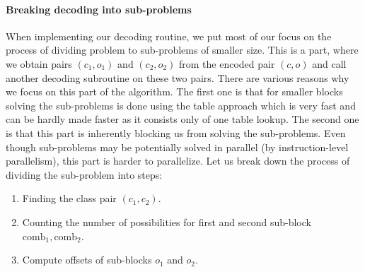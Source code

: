 \paragraph{Breaking decoding into sub-problems}

When implementing our decoding routine, we put most of our focus on the process of dividing problem to
sub-problems of smaller size. This is a part, where we obtain pairs $(c_1, o_1)$ and $(c_2, o_2)$
from the encoded pair $(c, o)$ and call another decoding subroutine on these two pairs.
There are various reasons why we focus on this part of the algorithm. The first one is that for smaller
blocks solving the sub-problems is done using the table approach which is very fast and can be hardly
made faster as it consists only of one table lookup. The second one is that this part is
inherently blocking us from solving the sub-problems. Even though sub-problems may be potentially
solved in parallel (by instruction-level parallelism), this part is harder to parallelize. Let us break down
the process of dividing the sub-problem into steps:

\begin{enumerate}
	\item Finding the class pair $(c_1, c_2)$.
	\item Counting the number of possibilities for first and second sub-block $\text{comb}_1, \text{comb}_2$.
	\item Compute offsets of sub-blocks $o_1$ and $o_2$.
\end{enumerate}

